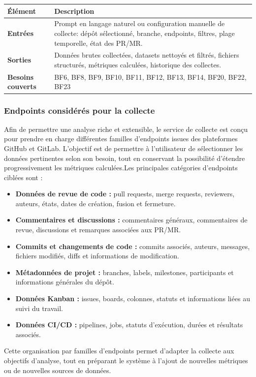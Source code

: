 \begin{table}[H]
\centering
\begin{tabular}{|p{4cm}|p{10cm}|}
\hline
\textbf{Élément} & \textbf{Description} \\
\hline
\textbf{Entrées} & Prompt en langage naturel ou configuration manuelle de collecte: dépôt sélectionné, branche, endpoints, filtres, plage temporelle, état des PR/MR. \\
\hline
\textbf{Sorties} & Données brutes collectées, datasets nettoyés et filtrés, fichiers structurés, métriques calculées, historique des collectes. \\
\hline
\textbf{Besoins couverts} & BF6, BF8, BF9, BF10, BF11, BF12, BF13, BF14, BF20, BF22, BF23 \\
\hline
\end{tabular}
\end{table}

\subsubsection*{Endpoints considérés pour la collecte}

Afin de permettre une analyse riche et extensible, le service de collecte est conçu pour prendre en charge différentes familles d’endpoints issues des plateformes GitHub et GitLab. L’objectif est de permettre à l’utilisateur de sélectionner les données pertinentes selon son besoin, tout en conservant la possibilité d’étendre progressivement les métriques calculées.Les principales catégories d’endpoints ciblées sont :
\begin{itemize}    
\item \textbf{Données de revue de code :} pull requests, merge requests, reviewers, auteurs, états, dates de création, fusion et fermeture.    
\item \textbf{Commentaires et discussions :} commentaires généraux, commentaires de revue, discussions et remarques associées aux PR/MR.    
\item \textbf{Commits et changements de code :} commits associés, auteurs, messages, fichiers modifiés, diffs et informations de modification.    
\item \textbf{Métadonnées de projet :} branches, labels, milestones, participants et informations générales du dépôt.    
\item \textbf{Données Kanban :} issues, boards, colonnes, statuts et informations liées au suivi du travail.    
\item \textbf{Données CI/CD :} pipelines, jobs, statuts d’exécution, durées et résultats associés.
\end{itemize}
Cette organisation par familles d’endpoints permet d’adapter la collecte aux objectifs d’analyse, tout en préparant le système à l’ajout de nouvelles métriques ou de nouvelles sources de données.

